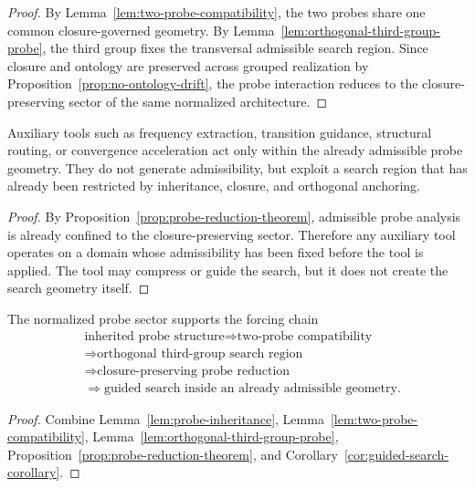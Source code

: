 \begin{proof}
By Lemma~\ref{lem:two-probe-compatibility}, the two probes share one common
closure-governed geometry. By Lemma~\ref{lem:orthogonal-third-group-probe}, the
third group fixes the transversal admissible search region. Since closure and
ontology are preserved across grouped realization by
Proposition~\ref{prop:no-ontology-drift}, the probe interaction reduces to the
closure-preserving sector of the same normalized architecture.
\end{proof}

\begin{corollary}
\label{cor:guided-search-corollary}
Auxiliary tools such as frequency extraction, transition guidance, structural
routing, or convergence acceleration act only within the already admissible
probe geometry. They do not generate admissibility, but exploit a search region
that has already been restricted by inheritance, closure, and orthogonal
anchoring.
\end{corollary}

\begin{proof}
By Proposition~\ref{prop:probe-reduction-theorem}, admissible probe analysis is
already confined to the closure-preserving sector. Therefore any auxiliary tool
operates on a domain whose admissibility has been fixed before the tool is
applied. The tool may compress or guide the search, but it does not create the
search geometry itself.
\end{proof}

\begin{corollary}
\label{cor:first-probe-forcing-chain}
The normalized probe sector supports the forcing chain
\[
\begin{aligned}
&\text{inherited probe structure}
  \Longrightarrow \text{two-probe compatibility}\\
&\Longrightarrow \text{orthogonal third-group search region}\\
&\Longrightarrow \text{closure-preserving probe reduction}\\
&\Longrightarrow \text{guided search inside an already admissible geometry}.
\end{aligned}
\]
\end{corollary}

\begin{proof}
Combine Lemma~\ref{lem:probe-inheritance},
Lemma~\ref{lem:two-probe-compatibility},
Lemma~\ref{lem:orthogonal-third-group-probe},
Proposition~\ref{prop:probe-reduction-theorem}, and
Corollary~\ref{cor:guided-search-corollary}.
\end{proof}



